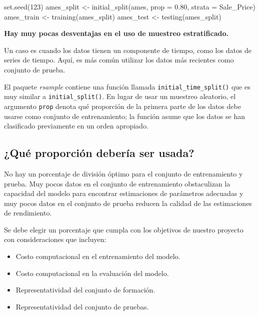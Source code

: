 \documentclass[
]{book}
\newenvironment{Shaded}{\begin{snugshade}}{\end{snugshade}}
\newcommand{\AttributeTok}[1]{\textcolor[rgb]{0.77,0.63,0.00}{#1}}
\newcommand{\DecValTok}[1]{\textcolor[rgb]{0.00,0.00,0.81}{#1}}
\newcommand{\FloatTok}[1]{\textcolor[rgb]{0.00,0.00,0.81}{#1}}
\newcommand{\FunctionTok}[1]{\textcolor[rgb]{0.00,0.00,0.00}{#1}}
\newcommand{\NormalTok}[1]{#1}
\newcommand{\OtherTok}[1]{\textcolor[rgb]{0.56,0.35,0.01}{#1}}
\providecommand{\tightlist}{%
  \setlength{\itemsep}{0pt}\setlength{\parskip}{0pt}}
\begin{document}
\begin{Shaded}
\begin{Highlighting}[]
\FunctionTok{set.seed}\NormalTok{(}\DecValTok{123}\NormalTok{)}
\NormalTok{ames\_split }\OtherTok{\textless{}{-}} \FunctionTok{initial\_split}\NormalTok{(ames, }\AttributeTok{prop =} \FloatTok{0.80}\NormalTok{, }\AttributeTok{strata =}\NormalTok{ Sale\_Price)}
\NormalTok{ames\_train }\OtherTok{\textless{}{-}} \FunctionTok{training}\NormalTok{(ames\_split)}
\NormalTok{ames\_test  }\OtherTok{\textless{}{-}}  \FunctionTok{testing}\NormalTok{(ames\_split)}
\end{Highlighting}
\end{Shaded}

\textbf{Hay muy pocas desventajas en el uso de muestreo estratificado.}

Un caso es cuando los datos tienen un componente de tiempo, como los datos de series de tiempo.
Aquí, es más común utilizar los datos más recientes como conjunto de prueba.

El paquete \emph{rsample} contiene una función llamada \texttt{initial\_time\_split()}
que es muy similar a \texttt{initial\_split()}. En lugar de usar un muestreo aleatorio, el argumento \texttt{prop}
denota qué proporción de la primera parte de los datos debe usarse como conjunto de entrenamiento;
la función asume que los datos se han clasificado previamente en un orden apropiado.

\hypertarget{quuxe9-proporciuxf3n-deberuxeda-ser-usada}{%
\subsection{¿Qué proporción debería ser usada?}\label{quuxe9-proporciuxf3n-deberuxeda-ser-usada}}

No hay un porcentaje de división óptimo para el conjunto de entrenamiento y prueba.
Muy pocos datos en el conjunto de entrenamiento obstaculizan la capacidad del modelo para encontrar estimaciones de parámetros adecuadas y muy pocos datos en el conjunto de prueba reducen la calidad de las estimaciones de rendimiento.

Se debe elegir un porcentaje que cumpla con los objetivos de nuestro proyecto con consideraciones que incluyen:

\begin{itemize}
\tightlist
\item
  Costo computacional en el entrenamiento del modelo.
\item
  Costo computacional en la evaluación del modelo.
\item
  Representatividad del conjunto de formación.
\item
  Representatividad del conjunto de pruebas.
\end{itemize}
\end{document}
